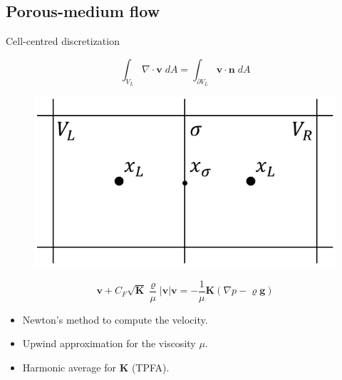 \documentclass{beamer}
\begin{document}
\subsection*{Porous-medium flow}
\begin{frame}{Cell-centred discretization}
\begin{minipage}[t]{0.49\textwidth}
	\vspace{0.5cm}
\begin{equation*}
\int_{V_L} \nabla \cdot \mathbf{v} \; dA = \int_{\partial V_L} \mathbf{v} 
\cdot \mathbf{n} \; dA
\end{equation*}
\end{minipage}
\begin{minipage}[t]{0.49\textwidth}
\begin{figure}
	\centering
	\includegraphics[height=0.3\textheight]{cctpfa.pdf}
\end{figure}
\end{minipage}
\begin{equation*}
	\mathbf{v} + C_F \sqrt{\mathbf{K}} \frac{\varrho}{\mu} |\mathbf{v}| 
	\mathbf{v} = - \frac{1}{\mu}\mathbf{K} (\nabla p - \varrho \mathbf{g})
\end{equation*}
\begin{itemize}
	\item Newton's method to compute the velocity.
	\item Upwind approximation for the viscosity $\mu$.
	\item Harmonic average for $\mathbf{K}$ (TPFA).
\end{itemize}
\end{frame}
\end{document}
